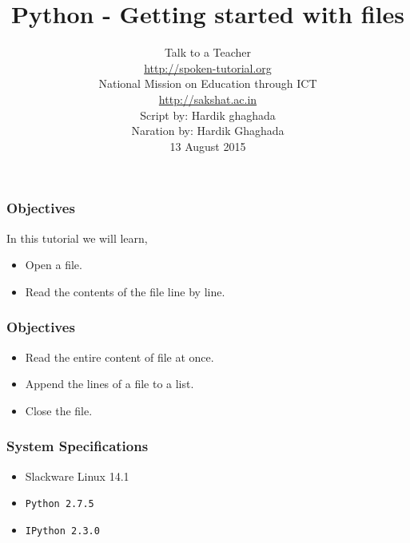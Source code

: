 \documentclass[17pt,compress]{beamer}
\author[FOSSEE]{}
\institute[IIT Bombay]{}
\date[]{}
\begin{document}
\sffamily \bfseries
\title
[Getting started with files]
{Python - Getting started with files}
\author
[FOSSEE, IIT - Bombay]
{\small Talk to a Teacher\\{\color{blue}\url{http://spoken-tutorial.org}}\\National Mission on Education
 through ICT\\{\color{blue}\url{http://sakshat.ac.in}} \\[0.5cm]{\tiny Script by: Hardik ghaghada \\ Naration by: Hardik Ghaghada \\ 13 August 2015}}

\begin{frame}
   \titlepage
\end{frame}
\begin{frame}
\frametitle{Objectives}
\label{sec-2.1}

  In this tutorial we will learn, \pause

\begin{itemize}
\item Open a file.\pause
\item Read the contents of the file line by line.
\end{itemize}
\end{frame}
\begin{frame}
\frametitle{Objectives}
\label{sec-2.2}

\begin{itemize}
\item Read the entire content of file at once.\pause
\item Append the lines of a file to a list.\pause
\item Close the file.
\end{itemize}
\end{frame}
\begin{frame}
\frametitle{System Specifications}\pause
\begin{itemize}
\item Slackware Linux 14.1\pause
\item \texttt{Python 2.7.5} \pause
\item \texttt{IPython 2.3.0}
\end{itemize}
\end{frame}
\end{document}
